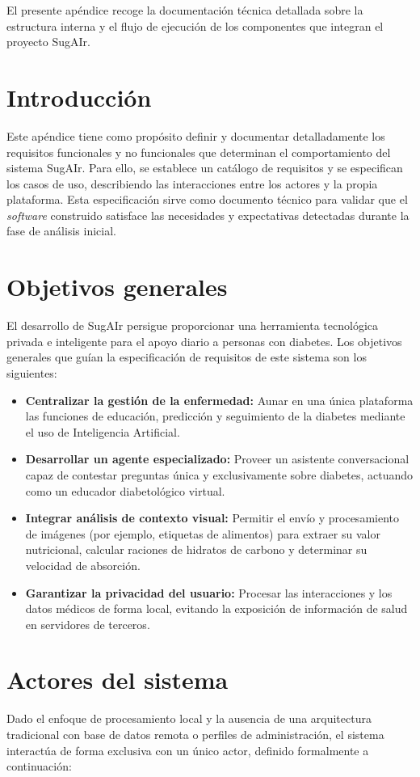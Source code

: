 El presente apéndice recoge la documentación técnica detallada sobre la estructura interna y el flujo de ejecución de los componentes que integran el proyecto SugAIr.
\section{Introducción}
Este apéndice tiene como propósito definir y documentar detalladamente los requisitos funcionales y no funcionales que determinan el comportamiento del sistema SugAIr. Para ello, se establece un catálogo de requisitos y se especifican los casos de uso, describiendo las interacciones entre los actores y la propia plataforma. Esta especificación sirve como documento técnico para validar que el \textit{software} construido satisface las necesidades y expectativas detectadas durante la fase de análisis inicial.

\section{Objetivos generales}
El desarrollo de SugAIr persigue proporcionar una herramienta tecnológica privada e inteligente para el apoyo diario a personas con diabetes. Los objetivos generales que guían la especificación de requisitos de este sistema son los siguientes:

\begin{itemize}
    \item \textbf{Centralizar la gestión de la enfermedad:} Aunar en una única plataforma las funciones de educación, predicción y seguimiento de la diabetes mediante el uso de Inteligencia Artificial.
    \item \textbf{Desarrollar un agente especializado:} Proveer un asistente conversacional capaz de contestar preguntas única y exclusivamente sobre diabetes, actuando como un educador diabetológico virtual.
    \item \textbf{Integrar análisis de contexto visual:} Permitir el envío y procesamiento de imágenes (por ejemplo, etiquetas de alimentos) para extraer su valor nutricional, calcular raciones de hidratos de carbono y determinar su velocidad de absorción.
    \item \textbf{Garantizar la privacidad del usuario:} Procesar las interacciones y los datos médicos de forma local, evitando la exposición de información de salud en servidores de terceros.
\end{itemize}

\section{Actores del sistema}
Dado el enfoque de procesamiento local y la ausencia de una arquitectura tradicional con base de datos remota o perfiles de administración, el sistema interactúa de forma exclusiva con un único actor, definido formalmente a continuación:

